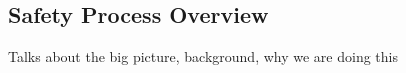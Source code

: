 \subsection{Safety Process Overview}
\label{subsec:process}

Talks about the big picture, background, why we are doing this